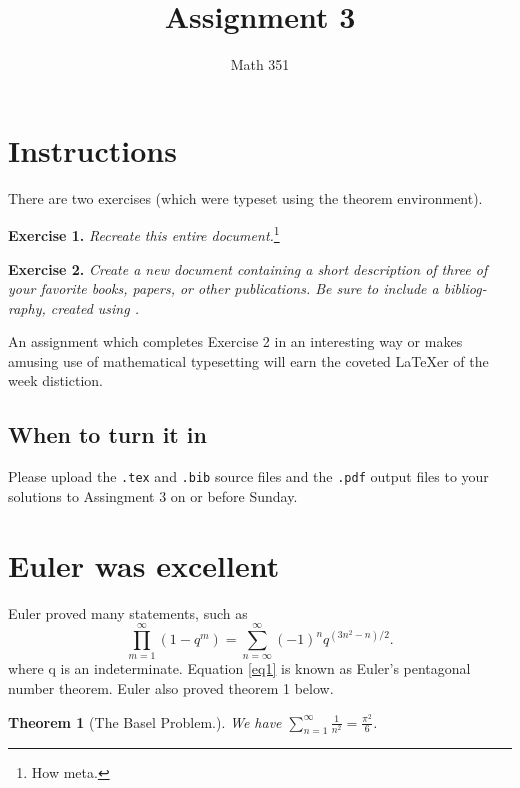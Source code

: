 \documentclass{article}
\title{Assignment 3}
\author{Math 351}
\date{}
\newtheorem{theorem}{Theorem}
\begin{document}
\maketitle

\tableofcontents
\section{Instructions}

There are two exercises (which were typeset using the theorem environment).\newline

\noindent\textbf{Exercise 1.} \emph{Recreate this entire document.}\footnote{How meta.}  \newline

\noindent\textbf{Exercise 2.} \emph{Create a new document containing a short description
of three of your favorite books, papers, or other publications. Be sure to include
a bibliog-raphy, created using .}  \newline

An assignment which completes Exercise 2 in an interesting way or makes amusing
use of mathematical typesetting will earn the coveted \LaTeX er of the week distiction.

\subsection[Due Date]{When to turn it in}

Please upload the \verb~.tex~ and \verb~.bib~ source files and the \verb~.pdf~ output files
to your solutions to Assingment 3 on or before Sunday.

\section{Euler was excellent}

Euler proved many statements, such as
\begin{equation}
    \prod_{m=1}^{\infty} \left(1-q^m\right) = \sum_{n=\infty}^{\infty} \left(-1\right)^n q^{\left(3n^2-n\right)/2}. \label{eq1}
\end{equation}
where q is an indeterminate. Equation \eqref{eq1} is known as Euler's pentagonal number
theorem. Euler also proved theorem 1 below.

\begin{theorem}[The Basel Problem.]
We have $\displaystyle\sum\limits_{n=1}^{\infty} \frac{1}{n^2} = \frac{\pi^2}{6}$.
\end{theorem}
\end{document}
